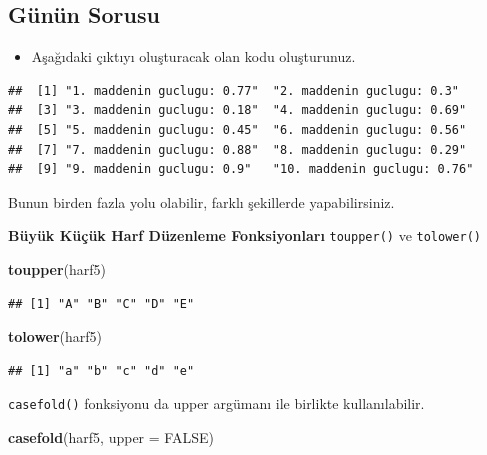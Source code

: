 \documentclass[
  oneside]{book}
\newenvironment{Shaded}{\begin{snugshade}}{\end{snugshade}}
\newcommand{\AttributeTok}[1]{\textcolor[rgb]{0.13,0.29,0.53}{#1}}
\newcommand{\ConstantTok}[1]{\textcolor[rgb]{0.56,0.35,0.01}{#1}}
\newcommand{\FunctionTok}[1]{\textcolor[rgb]{0.13,0.29,0.53}{\textbf{#1}}}
\newcommand{\NormalTok}[1]{#1}
\providecommand{\tightlist}{%
  \setlength{\itemsep}{0pt}\setlength{\parskip}{0pt}}
\begin{document}
\hypertarget{guxfcnuxfcn-sorusu}{%
\subsection{Günün Sorusu}\label{guxfcnuxfcn-sorusu}}

\begin{itemize}
\tightlist
\item
  Aşağıdaki çıktıyı oluşturacak olan kodu oluşturunuz.
\end{itemize}

\begin{verbatim}
##  [1] "1. maddenin guclugu: 0.77"  "2. maddenin guclugu: 0.3"  
##  [3] "3. maddenin guclugu: 0.18"  "4. maddenin guclugu: 0.69" 
##  [5] "5. maddenin guclugu: 0.45"  "6. maddenin guclugu: 0.56" 
##  [7] "7. maddenin guclugu: 0.88"  "8. maddenin guclugu: 0.29" 
##  [9] "9. maddenin guclugu: 0.9"   "10. maddenin guclugu: 0.76"
\end{verbatim}

Bunun birden fazla yolu olabilir, farklı şekillerde yapabilirsiniz.

\textbf{Büyük Küçük Harf Düzenleme Fonksiyonları} \texttt{toupper()} ve \texttt{tolower()}

\begin{Shaded}
\begin{Highlighting}[]
\FunctionTok{toupper}\NormalTok{(harf5)}
\end{Highlighting}
\end{Shaded}

\begin{verbatim}
## [1] "A" "B" "C" "D" "E"
\end{verbatim}

\begin{Shaded}
\begin{Highlighting}[]
\FunctionTok{tolower}\NormalTok{(harf5)}
\end{Highlighting}
\end{Shaded}

\begin{verbatim}
## [1] "a" "b" "c" "d" "e"
\end{verbatim}

\texttt{casefold()} fonksiyonu da upper argümanı ile birlikte kullanılabilir.

\begin{Shaded}
\begin{Highlighting}[]
\FunctionTok{casefold}\NormalTok{(harf5, }\AttributeTok{upper =} \ConstantTok{FALSE}\NormalTok{)}
\end{Highlighting}
\end{Shaded}
\end{document}
